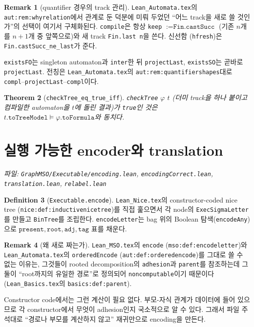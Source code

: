 \documentclass[11pt]{article}
\theoremstyle{definition}
\newtheorem{definition}{Definition}[section]
\newtheorem{remark}[definition]{Remark}
\theoremstyle{plain}
\newtheorem{theorem}[definition]{Theorem}
\newcommand{\lean}[1]{\texttt{#1}}
\newcommand{\leanfile}[1]{\texttt{#1}}
\begin{document}
\begin{remark}[quantifier 경우의 track 관리]
\leanfile{Lean\_Automata.tex}의 \lean{aut:rem:whyrelation}에서 관계로 둔
덕분에 미뤄 두었던 ``어느 track을 새로 쓸 것인가''의 선택이 여기서 구체화된다.
\lean{compile}은 항상 \lean{keep} $:= \lean{Fin.castSucc}$ (기존 $n$개를
$n+1$개 중 앞쪽으로)와 새 track \lean{Fin.last n}을 쓴다. 신선함
(\lean{hfresh})은 \lean{Fin.castSucc\_ne\_last}가 준다.

\lean{existsFO}는 singleton automaton과 \lean{inter}한 뒤 \lean{projectLast},
\lean{existsSO}는 곧바로 \lean{projectLast}. 전칭은
\leanfile{Lean\_Automata.tex}의 \lean{aut:rem:quantifiershapes}대로
\lean{compl}--\lean{projectLast}--\lean{compl}이다.
\end{remark}

\begin{theorem}[\lean{checkTree\_eq\_true\_iff}]
\label{alg:thm:checktree}
\lean{checkTree} $\varphi$ $t$ (더미 track을 하나 붙이고 컴파일한 automaton을
$t$에 돌린 결과)가 \lean{true}인 것은
$t.\lean{toTreeModel} \models \varphi.\lean{toFormula}$와 동치다.
\end{theorem}

\section{실행 가능한 encoder와 translation}
\label{alg:sec:execencode}

\emph{파일: \leanfile{GraphMSO/Executable/encoding.lean},
\leanfile{encodingCorrect.lean}, \leanfile{translation.lean},
\leanfile{relabel.lean}}

\begin{definition}[\lean{Executable.encode}]
\label{alg:def:execencode}
\leanfile{Lean\_Nice.tex}의 constructor-coded nice tree
(\lean{nice:def:inductivenicetree})를 직접 훑으면서 각 node의
\lean{ExecSigmaLetter}를 만들고 \lean{BinTree}를 조립한다.
\lean{encodeLetter}는 bag 위의 Boolean 탐색(\lean{encodeAny})으로
$\lean{present}, \lean{root}, \lean{adj}, \lean{tag}$ 표를 채운다.
\end{definition}

\begin{remark}[왜 새로 짜는가]
\label{alg:rem:whyreencode}
\leanfile{Lean\_MSO.tex}의 \lean{encode} (\lean{mso:def:encodeletter})와
\leanfile{Lean\_Automata.tex}의 \lean{orderedEncode}
(\lean{aut:def:orderedencode})를 그대로 쓸 수 없는 이유는, 그것들이
rooted decomposition의 \lean{adhesion}과 \lean{parent}를 참조하는데
그 둘이 ``root까지의 유일한 경로''로 정의되어 \lean{noncomputable}이기
때문이다 (\leanfile{Lean\_Basics.tex}의 \lean{basics:def:parent}).

Constructor code에서는 그런 계산이 필요 없다. 부모-자식 관계가 데이터에
들어 있으므로 각 constructor에서 무엇이 adhesion인지 국소적으로 알 수 있다.
그래서 파일 주석대로 ``경로나 부모를 계산하지 않고'' 재귀만으로 encoding을
만든다.
\end{remark}
\end{document}
